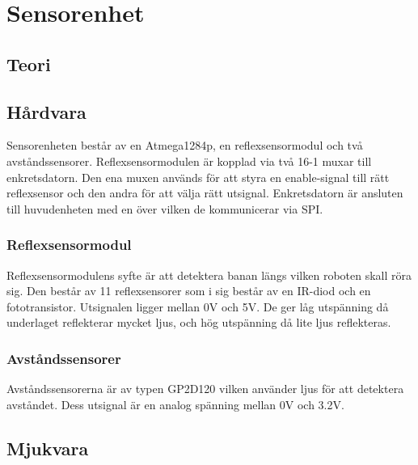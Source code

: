 
\section{Sensorenhet}

\subsection{Teori}

\subsection{Hårdvara}


Sensorenheten består av en Atmega1284p, en reflexsensormodul och två avståndssensorer. Reflexsensormodulen är kopplad via två 16-1 muxar till enkretsdatorn. Den ena muxen används för att styra en enable-signal till rätt reflexsensor och den andra för att välja rätt utsignal. Enkretsdatorn är ansluten till huvudenheten med en  över vilken de kommunicerar via SPI.

\subsubsection{Reflexsensormodul}

Reflexsensormodulens syfte är att detektera banan längs vilken roboten skall röra sig. Den består av 11 reflexsensorer som i sig består av en IR-diod och en fototransistor. Utsignalen ligger mellan 0V och 5V. De ger låg utspänning då underlaget reflekterar mycket ljus, och hög utspänning då lite ljus reflekteras.

\subsubsection{Avståndssensorer}

Avståndssensorerna är av typen GP2D120 vilken använder ljus för att detektera avståndet. Dess utsignal är en analog spänning mellan 0V och 3.2V.

\subsection{Mjukvara}

